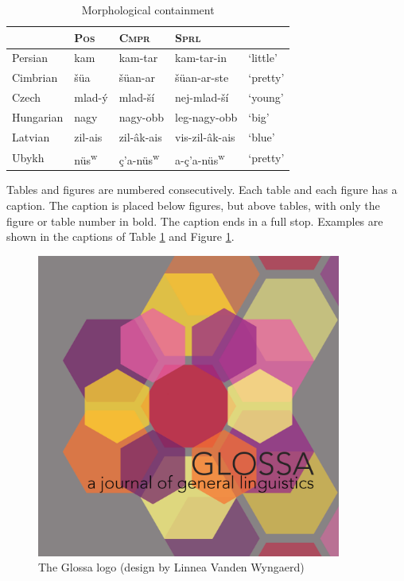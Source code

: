 \documentclass[charis,linguex]{glossa}
\begin{document}
\begin{table}[h]
\sffamily
\centering
\caption{Morphological containment}	
\begin{tabular}{lllll}
 & \textsc{Pos} & \textsc{Cmpr} & \textsc{Sprl}\\
\hline 
Persian & kam & kam-tar & kam-tar-in & ‘little’\\
Cimbrian & šüa & šüan-ar & šüan-ar-ste & ‘pretty’ \\
Czech & mlad-ý & mlad-ší & nej-mlad-ší & ‘young’\\
Hungarian & nagy & nagy-obb & leg-nagy-obb & ‘big’\\
Latvian & zil-ais & zil-âk-ais & vis-zil-âk-ais & ‘blue’\\
Ubykh &  nüs\textsuperscript{w}\textipa{@} & ç’a-nüs\textsuperscript{w}\textipa{@} & a-ç’a-nüs\textsuperscript{w}\textipa{@} & ‘pretty’ \\
\end{tabular}\label{tbl:table1}
\end{table}

Tables and figures are numbered consecutively. Each table and each figure has a caption. The caption is placed below figures, but above tables, with only the figure or table number in bold. The caption ends in a full stop. Examples are shown in the captions of Table \ref{tbl:table1} and Figure \ref{fig:glossalogo}. 

\begin{figure}[h]
\centering
\includegraphics[width=10cm]{glossa}
\caption{The Glossa logo (design by Linnea Vanden Wyngaerd)}
\label{fig:glossalogo}
\end{figure}
\end{document}
